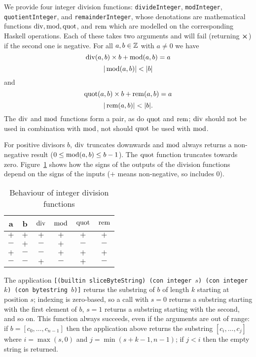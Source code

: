\label{note:integer-division-functions}
We provide four integer division functions: \texttt{divideInteger},
\texttt{modInteger}, \texttt{quotientInteger}, and \texttt{remainderInteger},
whose denotations are mathematical functions $\operatorname{div}, \operatorname{mod}, \operatorname{quot}$, and
$\operatorname{rem}$ which are modelled on the corresponding Haskell operations. Each of
these takes two arguments and will fail (returning $\errorX$) if the second one
is negative.  For all $a,b \in \mathbb{Z}$ with $a \ne 0$ we have
$$
\operatorname{div}(a,b) \times b + \operatorname{mod}(a,b) = a
$$
$$
  |\operatorname{mod}(a,b)| < |b|
$$\noindent and
$$
  \operatorname{quot}(a,b) \times b + \operatorname{rem}(a,b) = a
$$
$$
  |\operatorname{rem}(a,b)| < |b|.
$$
\noindent The $\operatorname{div}$ and $\operatorname{mod}$ functions form a pair, as do $\operatorname{quot}$ and $\operatorname{rem}$;
$\operatorname{div}$ should not be used in combination with $\operatorname{mod}$, not should $\operatorname{quot}$ be used
with $\operatorname{mod}$.

For positive divisors $b$, $\operatorname{div}$ truncates downwards and $\operatorname{mod}$ always
returns a non-negative result ($0 \leq \operatorname{mod}(a,b) \leq b-1$).  The $\operatorname{quot}$
function truncates towards zero.  Figure~\ref{fig:integer-division-signs} shows
how the signs of the outputs of the division functions depend on the signs of
the inputs ($+$ means non-negative, so includes 0).
\begin{table}[H]
  \centering
    \begin{tabular}{|cc|cc|cc|}
        \hline
        a & b & $\operatorname{div}$ & $\operatorname{mod}$ & $\operatorname{quot}$ & $\operatorname{rem}$ \\
        \hline
        $+$ & $+$ & $+$ & $+$ & $+$ & $+$ \\
        $-$ & $+$ & $-$ & $+$ & $-$ & $-$ \\
        $+$ & $-$ & $-$ & $+$ & $+$ & $+$ \\
        $-$ & $-$ & $+$ & $-$ & $+$ & $-$ \\
        \hline
        \end{tabular}
   \caption{Behaviour of integer division functions}
   \label{fig:integer-division-signs}
\end{table}

\label{note:slicebytestring}
The application \texttt{[(builtin sliceByteString) (con integer $s$) (con
    integer $k$) (con bytestring $b$)]} returns the substring of $b$ of length
$k$ starting at position $s$; indexing is zero-based, so a call with $s=0$
returns a substring starting with the first element of $b$, $s=1$ returns a
substring starting with the second, and so on.  This function always succeeds,
even if the arguments are out of range: if $b=[c_0, \ldots, c_{n-1}]$ then the
  application above returns the substring $[c_i, \ldots, c_j]$ where
  $i=\max(s,0)$ and $j=\min(s+k-1, n-1)$; if $j<i$ then the empty string is returned.
  

